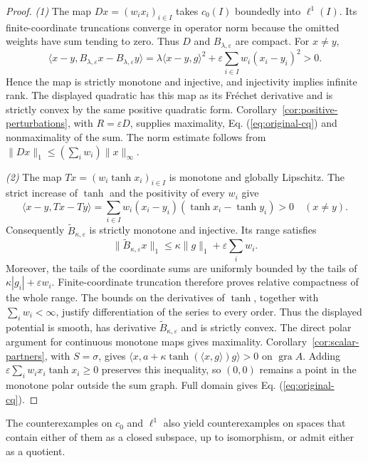 \documentclass[11pt]{article}
\newcommand{\gra}{\operatorname{gra}}
\newcommand{\pair}[2]{\langle #1,#2\rangle}
\theoremstyle{definition}
\theoremstyle{remark}
\begin{document}
\begin{proof}
\noindent\textit{(1)} The map $Dx=(w_ix_i)_{i\in I}$ takes $c_0(I)$ boundedly into $\ell^1(I)$. Its finite-coordinate truncations converge in operator norm because the omitted weights have sum tending to zero. Thus $D$ and $B_{\lambda,\varepsilon}$ are compact. For $x\ne y$,
\[
\pair{x-y}{B_{\lambda,\varepsilon}x-B_{\lambda,\varepsilon}y}
=\lambda\pair{x-y}{g}^2+\varepsilon\sum_{i\in I}w_i(x_i-y_i)^2>0.
\]
Hence the map is strictly monotone and injective, and injectivity implies infinite rank. The displayed quadratic has this map as its Fr\'{e}chet derivative and is strictly convex by the same positive quadratic form. Corollary~\ref{cor:positive-perturbations}, with $R=\varepsilon D$, supplies maximality, Eq. (\ref{eq:original-cq}) and nonmaximality of the sum. The norm estimate follows from $\|Dx\|_1\le(\sum_iw_i)\|x\|_\infty$.

\noindent\textit{(2)} The map $Tx=(w_i\tanh x_i)_{i\in I}$ is monotone and globally Lipschitz. The strict increase of $\tanh$ and the positivity of every $w_i$ give
\[
\pair{x-y}{Tx-Ty}
=\sum_{i\in I}w_i(x_i-y_i)(\tanh x_i-\tanh y_i)>0
\quad(x\ne y).
\]
Consequently $\widetilde B_{\kappa,\varepsilon}$ is strictly monotone and injective. Its range satisfies
\[
\|\widetilde B_{\kappa,\varepsilon}x\|_1
\le\kappa\|g\|_1+\varepsilon\sum_iw_i.
\]
Moreover, the tails of the coordinate sums are uniformly bounded by the tails of $\kappa|g_i|+\varepsilon w_i$. Finite-coordinate truncation therefore proves relative compactness of the whole range. The bounds on the derivatives of $\tanh$, together with $\sum_iw_i<\infty$, justify differentiation of the series to every order. Thus the displayed potential is smooth, has derivative $\widetilde B_{\kappa,\varepsilon}$ and is strictly convex. The direct polar argument for continuous monotone maps gives maximality. Corollary~\ref{cor:scalar-partners}, with $S=\sigma$, gives $\pair{x}{a+\kappa\tanh(\pair{x}{g})g}>0$ on $\gra A$. Adding $\varepsilon\sum_iw_ix_i\tanh x_i\ge0$ preserves this inequality, so $(0,0)$ remains a point in the monotone polar outside the sum graph. Full domain gives Eq. (\ref{eq:original-cq}).
\end{proof}

The counterexamples on $c_0$ and $\ell^1$ also yield counterexamples on spaces that contain either of them as a closed subspace, up to isomorphism, or admit either as a quotient.
\end{document}
